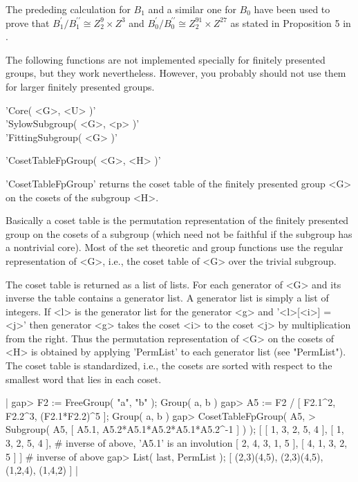 The prededing calculation for $B_1$ and a similar one for $B_0$ have been
used  to prove that $B_1^\prime /  B_1^{\prime \prime} \cong Z_2^9 \times
Z^3$ and $B_0^\prime / B_0^{\prime  \prime} \cong Z_2^{91} \times Z^{27}$
as stated in Proposition 5 in \cite{FJNT95}.

The following  functions  are  not  implemented  specially  for  finitely
presented groups,  but  they work  nevertheless.   However,  you probably
should not use them for larger finitely presented groups.

'Core( <G>, <U> )' \\
'SylowSubgroup( <G>, <p> )' \\
'FittingSubgroup( <G> )'


'CosetTableFpGroup( <G>, <H> )'

'CosetTableFpGroup' returns the  coset  table of the  finitely  presented
group <G> on the cosets of the subgroup <H>.

Basically a coset table is the permutation representation of the finitely
presented group on the cosets of a subgroup  (which need  not be faithful
if the subgroup has a nontrivial  core).  Most  of  the set theoretic and
group functions use the regular  representation of <G>, i.e.,  the  coset
table of <G> over the trivial subgroup.

The coset table is  returned as a list of  lists.   For each generator of
<G> and  its inverse the table  contains  a generator list.   A generator
list is simply a list of integers.  If <l> is the  generator list for the
generator <g> and '<l>[<i>] = <j>' then generator <g> takes the coset <i>
to the coset <j> by multiplication from the  right.  Thus the permutation
representation of  <G>  on  the  cosets of <H>  is  obtained by  applying
'PermList' to each  generator list (see "PermList").   The coset table is
standardized,  i.e., the cosets are  sorted with  respect to the smallest
word that lies in each coset.

|    gap> F2 := FreeGroup( "a", "b" );
    Group( a, b )
    gap> A5 := F2 / [ F2.1^2, F2.2^3, (F2.1*F2.2)^5 ];
    Group( a, b )
    gap> CosetTableFpGroup( A5,
    >            Subgroup( A5, [ A5.1, A5.2*A5.1*A5.2*A5.1*A5.2^-1 ] ) );
    [ [ 1, 3, 2, 5, 4 ],
      [ 1, 3, 2, 5, 4 ],    # inverse of above, 'A5.1' is an involution
      [ 2, 4, 3, 1, 5 ],
      [ 4, 1, 3, 2, 5 ] ]   # inverse of above
    gap> List( last, PermList );
    [ (2,3)(4,5), (2,3)(4,5), (1,2,4), (1,4,2) ] |


